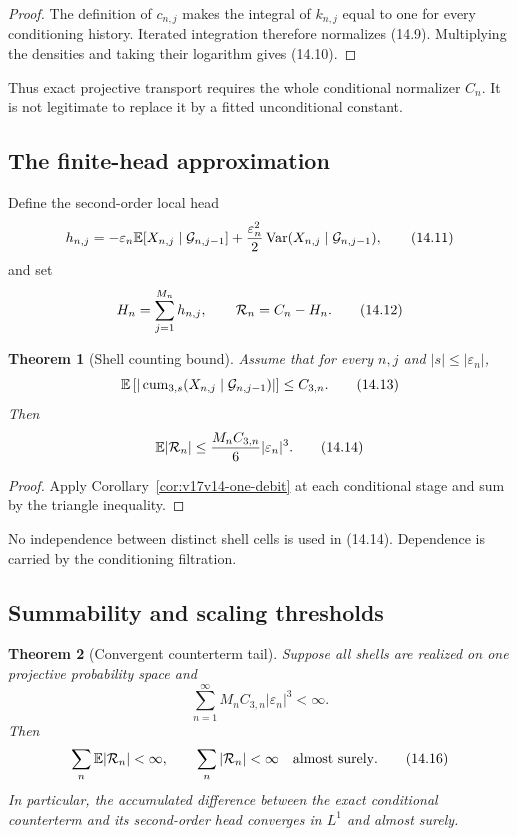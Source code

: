 \documentclass[11pt]{article}
\newtheorem{theorem}{Theorem}[section]
\theoremstyle{remark}
\begin{document}
\begin{proof}
The definition of \(c_{n,j}\) makes the integral of \(k_{n,j}\)
equal to one for every conditioning history.  Iterated integration
therefore normalizes (14.9).  Multiplying the densities and taking
their logarithm gives (14.10).
\end{proof}

Thus exact projective transport requires the whole conditional
normalizer \(C_n\).  It is not legitimate to replace it by a fitted
unconditional constant.

\subsection{The finite-head approximation}

Define the second-order local head
\[
 h_{n,j}
 =-\varepsilon_n
   \mathbb E[X_{n,j}\mid{\cal G}_{n,j-1}]
 +\frac{\varepsilon_n^2}{2}
   \operatorname{Var}(X_{n,j}\mid{\cal G}_{n,j-1}),                \tag{14.11}
\]
and set
\[
 H_n=\sum_{j=1}^{M_n}h_{n,j},
 \qquad
 {\cal R}_n=C_n-H_n.                               \tag{14.12}
\]

\begin{theorem}[Shell counting bound]
\label{thm:v17v14-counting}
Assume that for every \(n,j\) and
\(|s|\leq|\varepsilon_n|\),
\[
 \mathbb E
 \left[
 |\operatorname{cum}_{3,s}
 (X_{n,j}\mid{\cal G}_{n,j-1})|
 \right]\leq C_{3,n}.                              \tag{14.13}
\]
Then
\[
 \mathbb E|{\cal R}_n|
 \leq\frac{M_nC_{3,n}}{6}|\varepsilon_n|^3.        \tag{14.14}
\]
\end{theorem}

\begin{proof}
Apply Corollary~\ref{cor:v17v14-one-debit} at each conditional
stage and sum by the triangle inequality.
\end{proof}

No independence between distinct shell cells is used in (14.14).
Dependence is carried by the conditioning filtration.

\subsection{Summability and scaling thresholds}

\begin{theorem}[Convergent counterterm tail]
\label{thm:v17v14-summability}
Suppose all shells are realized on one projective probability space
and
\[
 \sum_{n=1}^{\infty}
 M_nC_{3,n}|\varepsilon_n|^3<\infty.               \tag{14.15}
\]
Then
\[
 \sum_n\mathbb E|{\cal R}_n|<\infty,\qquad
 \sum_n|{\cal R}_n|<\infty\quad\text{almost surely}.               \tag{14.16}
\]
In particular, the accumulated difference between the exact
conditional counterterm and its second-order head converges in
\(L^1\) and almost surely.
\end{theorem}
\end{document}
